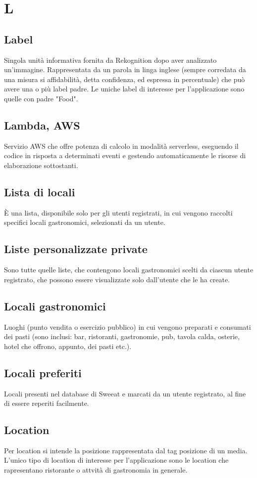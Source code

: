 \section{L}

\subsection{Label}
Singola unità informativa fornita da Rekognition dopo aver analizzato un'immagine. Rappresentata da un parola in linga inglese (sempre corredata da una misura si affidabilità, detta confidenza, ed espressa in percentuale) che può avere una o più label padre. Le uniche label di interesse per l'applicazione sono quelle con padre "Food".

\subsection{Lambda, AWS}
Servizio AWS che offre potenza di calcolo in modalità serverless, eseguendo il codice in risposta a determinati eventi e gestendo automaticamente le risorse di elaborazione sottostanti. 

\subsection{Lista di locali} È una lista, disponibile solo per gli utenti registrati, in cui vengono raccolti specifici locali gastronomici, selezionati da un utente.

\subsection{Liste personalizzate private} Sono tutte quelle liste, che contengono locali gastronomici scelti da ciascun utente registrato, che possono essere visualizzate solo dall’utente che le ha create.



\subsection{Locali gastronomici} Luoghi (punto vendita o esercizio pubblico) in cui vengono preparati e consumati dei pasti (sono inclusi: bar, ristoranti, gastronomie, pub, tavola calda, osterie, hotel che offrono, appunto, dei pasti etc.).

\subsection{Locali preferiti} Locali presenti nel database di Sweeat e marcati da un utente registrato, al fine di essere reperiti facilmente.

\subsection{Location}
Per location si intende la posizione rappresentata dal tag posizione di un media. L'unico tipo di location di interesse per l'applicazione sono le location che rapresentano ristorante o attvità di gastronomia in generale.

\clearpage